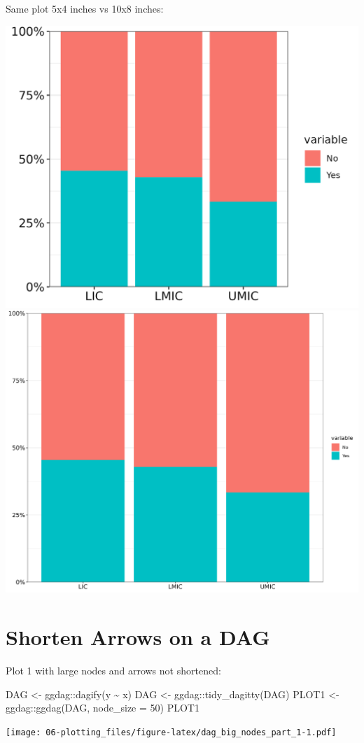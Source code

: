\documentclass[
]{book}
\newenvironment{Shaded}{\begin{snugshade}}{\end{snugshade}}
\newcommand{\AttributeTok}[1]{\textcolor[rgb]{0.77,0.63,0.00}{#1}}
\newcommand{\DecValTok}[1]{\textcolor[rgb]{0.00,0.00,0.81}{#1}}
\newcommand{\FunctionTok}[1]{\textcolor[rgb]{0.00,0.00,0.00}{#1}}
\newcommand{\NormalTok}[1]{#1}
\newcommand{\OtherTok}[1]{\textcolor[rgb]{0.56,0.35,0.01}{#1}}
\newcommand{\SpecialCharTok}[1]{\textcolor[rgb]{0.00,0.00,0.00}{#1}}
\begin{document}
Same plot 5x4 inches vs 10x8 inches:

\includegraphics[width=0.5\linewidth]{img/barplot_5x4}
\includegraphics[width=0.5\linewidth]{img/barplot_10x8}

\hypertarget{shorten-arrows-on-a-dag}{%
\section{Shorten Arrows on a DAG}\label{shorten-arrows-on-a-dag}}

Plot 1 with large nodes and arrows not shortened:

\begin{Shaded}
\begin{Highlighting}[]
\NormalTok{DAG }\OtherTok{\textless{}{-}}\NormalTok{ ggdag}\SpecialCharTok{::}\FunctionTok{dagify}\NormalTok{(y }\SpecialCharTok{\textasciitilde{}}\NormalTok{ x)}
\NormalTok{DAG }\OtherTok{\textless{}{-}}\NormalTok{ ggdag}\SpecialCharTok{::}\FunctionTok{tidy\_dagitty}\NormalTok{(DAG)}
\NormalTok{PLOT1 }\OtherTok{\textless{}{-}}\NormalTok{ ggdag}\SpecialCharTok{::}\FunctionTok{ggdag}\NormalTok{(DAG, }\AttributeTok{node\_size =} \DecValTok{50}\NormalTok{)}
\NormalTok{PLOT1}
\end{Highlighting}
\end{Shaded}

\texttt{[image: 06-plotting\_files/figure-latex/dag\_big\_nodes\_part\_1-1.pdf]}
\end{document}
